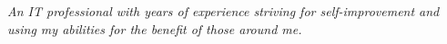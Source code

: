 %
%
%

\par{
    \begin{center}
    \emph{An IT professional with years of experience striving for self-improvement 
    and using my abilities for the benefit of those around me.}
    \end{center}
}